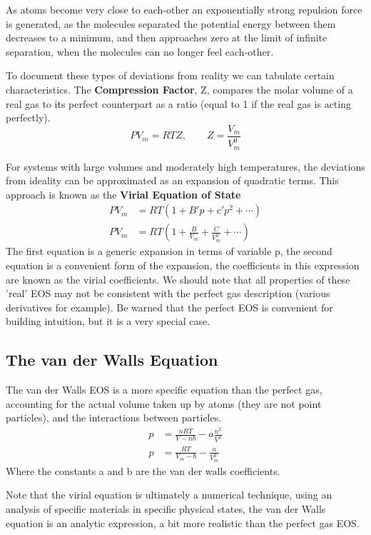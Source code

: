 \documentclass{article}
\newcommand{\be}{\begin{equation}}
\newcommand{\ee}{\end{equation}}
\begin{document}
As atoms become very close to each-other an exponentially strong repulsion force is generated, as the molecules separated the potential energy between them decreases to a minimum, and then approaches zero at the limit of infinite separation, when the molecules can no longer feel each-other. 

To document these types of deviations from reality we can tabulate certain characteristics.
The \textbf{Compression Factor}, Z, compares the molar volume of a real gas to its perfect counterpart as a ratio (equal to 1 if the real gas is acting perfectly).
\be
PV_m = RTZ, \qquad Z = \frac{V_m}{V_m^0}
\ee

For systems with large volumes and moderately high temperatures, the deviations from ideality can be approximated as an expansion of quadratic terms.
This approach is known as the \textbf{Virial Equation of State}
\be
\begin{split}
PV_m &= RT\left( 1+B'p + c'p^2 + \cdots  \right)\\
PV_m &= RT \left( 1 + \frac{B}{V_m} + \frac{C}{V_m^2} + \cdots \right)
\end{split}
\ee
The first equation is a generic expansion in terms of variable p, the second equation is a convenient form of the expansion, the coefficients in this expression are known as the virial coefficients. 
We should note that all properties of these 'real' EOS may not be consistent with the perfect gas description (various derivatives for example). 
Be warned that the perfect EOS is convenient for building intuition, but it is a very special case. 

\subsection*{The van der Walls Equation}
The van der Walls EOS is a more specific equation than the perfect gas, accounting for the actual volume taken up by atoms (they are not point particles), and the interactions between particles. 
\be
\begin{split}
p &= \frac{nRT}{V-nb} - a\frac{n^2}{V^2} \\
p &= \frac{RT}{V_m-b} - \frac{a}{V_m^2}
\end{split}
\ee
Where the constants a and b are the van der walls coefficients. 

Note that the virial equation is ultimately a numerical technique, using an analysis of specific materials in specific physical states, the van der Walls equation is an analytic expression, a bit more realistic than the perfect gas EOS. 
\end{document}
